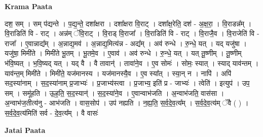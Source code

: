 \documentclass[17pt]{extarticle}
\begin{document}
\textbf{Krama Paata} \newline

दश॒ सम् । सम् प॑द्यन्ते । प॒द्य॒न्ते॒ दशा᳚क्षरा । दशा᳚क्षरा वि॒राट् । दशा᳚क्ष॒रेति॒ दश॑ - अ॒क्ष॒रा॒ । वि॒राडन्न᳚म् । वि॒राडिति॑ वि - राट् । अन्न॑म् ॅवि॒राट् । वि॒राड् वि॒राजा᳚ । वि॒राडिति॑ वि - राट् । वि॒राजै॒व । वि॒राजेति॑ वि - राजा᳚ । ए॒वान्नाद्य᳚म् । अ॒न्नाद्य॒मव॑ । अ॒न्नाद्य॒मित्य॑न्न - अद्य᳚म् । अव॑ रुन्धे । रु॒न्धे॒ यत् । यद् यजु॑षा । यजु॑षा॒ मिमी॑ते । मिमी॑ते भू॒तम् । भू॒तमे॒व । ए॒वाव॑ । अव॑ रुन्धे । रु॒न्धे॒ यत् । यत् तू॒ष्णीम् । तू॒ष्णीम् भ॑वि॒ष्यत् । भ॒वि॒ष्यद् यत् । यद् वै । वै तावान्॑ । तावा॑ने॒व । ए॒व सोमः॑ । सोमः॒ स्यात् । स्याद् याव॑न्तम् । याव॑न्त॒म् मिमी॑ते । मिमी॑ते॒ यज॑मानस्य । यज॑मानस्यै॒व । ए॒व स्या᳚त् । स्या॒न् न । नापि॑ । अपि॑ सद॒स्या॑नाम् । स॒द॒स्या॑नाम् प्र॒जाभ्यः॑ । प्र॒जाभ्य॑स्त्वा । प्र॒जाभ्य॒ इति॑ प्र - जाभ्यः॑ । त्वेति॑ । इत्युप॑ । उप॒ सम् । समू॑हति । ऊ॒ह॒ति॒ स॒द॒स्यान्॑ । स॒द॒स्या॑ने॒व । ए॒वान्वाभ॑जति । अ॒न्वाभ॑जति॒ वास॑सा । अ॒न्वाभ॑ज॒तीत्य॑नु - आभ॑जति । वास॒सोप॑ । उप॑ नह्यति । न॒ह्य॒ति॒ स॒र्व॒दे॒व॒त्य᳚म् । स॒र्व॒दे॒व॒त्य॑म् ॅवै ( ) । स॒र्व॒दे॒व॒त्य॑मिति॑ सर्व - दे॒व॒त्य᳚म् । वै वासः॑ \newline

\textbf{Jatai Paata} \newline
\end{document}
